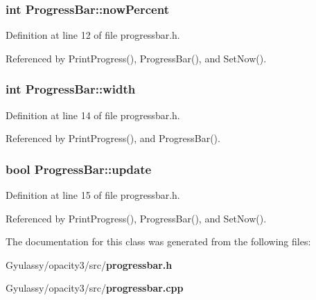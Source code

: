 \subsubsection{\setlength{\rightskip}{0pt plus 5cm}int {\bf ProgressBar::nowPercent}\hspace{0.3cm}{\tt  [private]}}\label{classProgressBar_da00c88aa213354c1b9fc4d9d9feba74}




Definition at line 12 of file progressbar.h.

Referenced by PrintProgress(), ProgressBar(), and SetNow().
\subsubsection{\setlength{\rightskip}{0pt plus 5cm}int {\bf ProgressBar::width}\hspace{0.3cm}{\tt  [private]}}\label{classProgressBar_49d68b4372aec9c7622b4f88764bc2ca}




Definition at line 14 of file progressbar.h.

Referenced by PrintProgress(), and ProgressBar().
\subsubsection{\setlength{\rightskip}{0pt plus 5cm}bool {\bf ProgressBar::update}\hspace{0.3cm}{\tt  [private]}}\label{classProgressBar_aaf24bac272f65fcbefc354913d402da}




Definition at line 15 of file progressbar.h.

Referenced by PrintProgress(), ProgressBar(), and SetNow().

The documentation for this class was generated from the following files:\begin{CompactItemize}
\item 
Gyulassy/opacity3/src/{\bf progressbar.h}\item 
Gyulassy/opacity3/src/{\bf progressbar.cpp}\end{CompactItemize}
